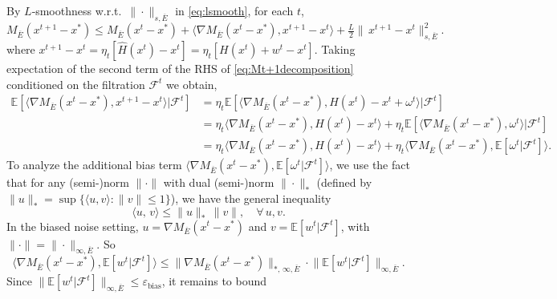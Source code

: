 By $L$‐smoothness w.r.t.\ $\|\cdot\|_{s,\overline{E}}$ in \eqref{eq:lsmooth}, for each $t$,
\begin{equation} \label{eq:Mt+1decomposition}
  M_{\overline{E}}(x^{t+1} - x^*) \leq M_{\overline{E}}(x^t - x^*)+\bigl\langle \nabla M_{\overline{E}}(x^t-x^*),x^{t+1}-x^t \bigr\rangle+\tfrac{L}{2}\|\,x^{t+1}-x^t\|_{s,\overline{E}}^2.
\end{equation}
where $x^{t+1}-x^t = \eta_t[\widehat{H}(x^t)-x^t] = \eta_t[H(x^t) + w^t - x^t]$. Taking expectation of the second term of the RHS of \eqref{eq:Mt+1decomposition} conditioned on the filtration $\mathcal{F}^t$ we obtain,
\begin{align} \label{eq:nablaMt+1decomposition}
    \mathbb{E}[\langle \nabla M_{\overline{E}}(x^t - x^*), x^{t+1} - x^t \rangle | \mathcal{F}^t] &= \eta_t \mathbb{E}[\langle \nabla M_{\overline{E}}(x^t - x^*), H(x^t) - x^t + \omega^t \rangle| \mathcal{F}^t] \nonumber\\
    &= \eta_t\langle \nabla M_{\overline{E}}(x^t - x^*), H(x^t) - x^t \rangle + \eta_t\mathbb{E}[\langle \nabla M_{\overline{E}}(x^t - x^*),\omega^t \rangle | \mathcal{F}^t] \nonumber\\
     &= \eta_t\langle \nabla M_{\overline{E}}(x^t - x^*), H(x^t) - x^t \rangle + \eta_t\langle \nabla M_{\overline{E}}(x^t - x^*), \mathbb{E}[\omega^t | \mathcal{F}^t] \rangle .
\end{align}
To analyze the additional bias term $\langle \nabla M_{\overline{E}}(x^t - x^*), \mathbb{E}[\omega^t | \mathcal{F}^t] \rangle$, we use the fact that for any (semi-)norm $\|\cdot\|$ with dual (semi-)norm $\|\cdot\|_*$ (defined by 
$\|u\|_* = \sup\{\langle u,v\rangle : \|v\|\le1\}$),
we have the general inequality
\begin{equation}\label{eq:dualNormIneq}
  \bigl\langle u,\,v\bigr\rangle\leq\|u\|_{*}\,\|v\|,
  \quad
  \forall\,u,v.
\end{equation}
In the biased noise setting, $u=\nabla M_{\overline{E}}(x^t - x^*)$ and $v=\mathbb{E}[w^t| \mathcal{F}^t]$, with $\|\cdot\|=\|\cdot\|_{\infty,\overline{E}}$.  So
\begin{equation} \label{eq:inner_product_bound}
  \bigl\langle 
    \nabla M_{\overline{E}}(x^t - x^*),
    \mathbb{E}[w^t| \mathcal{F}^t]
  \bigr\rangle \leq \bigl\|\nabla M_{\overline{E}}(x^t - x^*)\bigr\|_{*,\,\infty,\overline{E}}\cdot \bigl\|\mathbb{E}[w^t| \mathcal{F}^t]\bigr\|_{\infty,\overline{E}}.   
\end{equation}
Since $\|\mathbb{E}[w^t| \mathcal{F}^t]\|_{\infty,\overline{E}} \le \varepsilon_{\text{bias}}$, it remains to bound 

